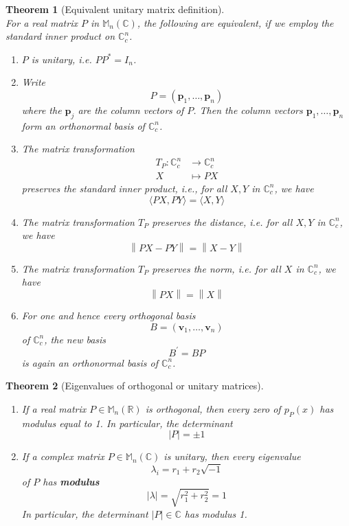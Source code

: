 \documentclass[12pt]{article}
\newcommand\norm[1]{\left\lVert#1\right\rVert}
\newtheorem{theorem}{Theorem}[section]
\theoremstyle{definition}
\begin{document}
\begin{theorem}[Equivalent unitary matrix definition]
\hfill\\\normalfont For a real matrix $P$ in $\mathbb{M}_n(\mathbb{C})$, the following are equivalent, if we employ the standard inner product on $\mathbb{C}_c^n$.
\begin{enumerate}[label=(\arabic*)]
\item $P$ is unitary, i.e. $PP^\ast = I_n$.
\item Write 
\[
P=(\mathbf{p}_1,\ldots, \mathbf{p}_n)
\]
where the $\mathbf{p}_j$ are the column vectors of $P$. Then the column vectors $\mathbf{p}_1,\ldots, \mathbf{p}_n$ form an orthonormal basis of $\mathbb{C}_c^n$.
\item The matrix transformation
\[
\begin{aligned}
T_P:\mathbb{C}_c^n&\to \mathbb{C}_c^n\\
X&\mapsto PX
\end{aligned}
\]
preserves the standard inner product, i.e., for all $X,Y$ in $\mathbb{C}_c^n$, we have
\[
\langle PX, PY\rangle = \langle X,Y\rangle
\]
\item The matrix transformation $T_P$ preserves the distance, i.e. for all $X,Y$ in $\mathbb{C}_c^n$, we have
\[
\norm{PX-PY}=\norm{X-Y}
\]
\item The matrix transformation $T_P$ preserves the norm, i.e. for all $X$ in $\mathbb{C}_c^n$, we have
\[
\norm{PX}=\norm{X}
\]
\item For one and hence every orthogonal basis
\[
B=(\mathbf{v}_1,\ldots, \mathbf{v}_n)
\]
of $\mathbb{C}_c^n$, the new basis
\[
B^\prime = BP
\]
is again an orthonormal basis of $\mathbb{C}_c^n$.
\end{enumerate}
\end{theorem}
\begin{theorem}[Eigenvalues of orthogonal or unitary matrices]
\hfill\\\normalfont
\begin{enumerate}[label = (\arabic*)]
\item If a real matrix $P\in\mathbb{M}_n(\mathbb{R})$ is orthogonal, then every zero of $p_P(x)$ has modulus equal to 1. In particular, the determinant
\[
|P|=\pm 1
\]
\item If a complex matrix $P\in\mathbb{M}_n(\mathbb{C})$ is unitary, then every eigenvalue
\[
\lambda_i =r_1+r_2\sqrt{-1}
\]
of $P$ has \textbf{modulus}
\[
|\lambda| = \sqrt{r_1^2+r_2^2}=1
\]
In particular, the determinant $|P|\in\mathbb{C}$ has modulus 1.
\end{enumerate}
\end{theorem}
\end{document}
